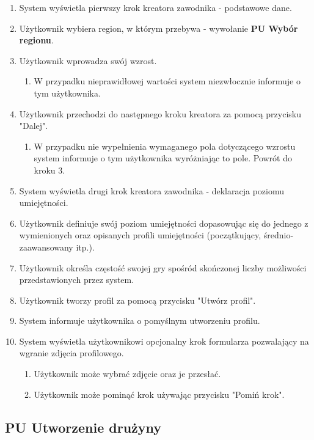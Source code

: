 \begin{enumerate}
  \item System wyświetla pierwszy krok kreatora zawodnika - podstawowe dane.
  \item Użytkownik wybiera region, w którym przebywa - wywołanie \textbf{PU Wybór regionu}.
  \item Użytkownik wprowadza swój wzrost.
  \begin{enumerate}[label=(\alph*)]
     \item W przypadku nieprawidłowej wartości system niezwłocznie informuje o tym użytkownika.
   \end{enumerate}
  \item Użytkownik przechodzi do następnego kroku kreatora za pomocą przycisku "Dalej".
  \begin{enumerate}[label=(\alph*)]
     \item W przypadku nie wypełnienia wymaganego pola dotyczącego wzrostu system informuje o tym użytkownika wyróżniając to pole. Powrót do kroku 3.
   \end{enumerate}
     
  \item System wyświetla drugi krok kreatora zawodnika - deklaracja poziomu umiejętności.
  \item Użytkownik definiuje swój poziom umiejętności dopasowując się do jednego z wymienionych oraz opisanych profili umiejętności (początkujący, średnio-zaawansowany itp.).
  \item Użytkownik określa częstość swojej gry spośród skończonej liczby możliwości przedstawionych przez system.
  \item Użytkownik tworzy profil za pomocą przycisku "Utwórz profil".
  \item System informuje użytkownika o pomyślnym utworzeniu profilu.
  \item System wyświetla użytkownikowi opcjonalny krok formularza pozwalający na wgranie zdjęcia profilowego.
 
  \begin{enumerate}[label=(\alph*)]
     \item Użytkownik może wybrać zdjęcie oraz je przesłać.
     \item Użytkownik może pominąć krok używając przycisku "Pomiń krok".
   \end{enumerate}
\end{enumerate}

\subsection*{PU Utworzenie drużyny}

